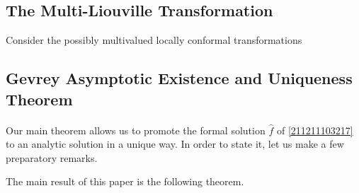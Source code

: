 \documentclass[11pt]{article}
\begin{document}
\subsection{The Multi-Liouville Transformation}



Consider the possibly multivalued locally conformal transformations










\subsection{Gevrey Asymptotic Existence and Uniqueness Theorem}


\paragraph{}
Our main theorem allows us to promote the formal solution $\hat{f}$ of \eqref{211211103217} to an analytic solution in a unique way.
In order to state it, let us make a few preparatory remarks.










\HRule









The main result of this paper is the following theorem.
\end{document}
